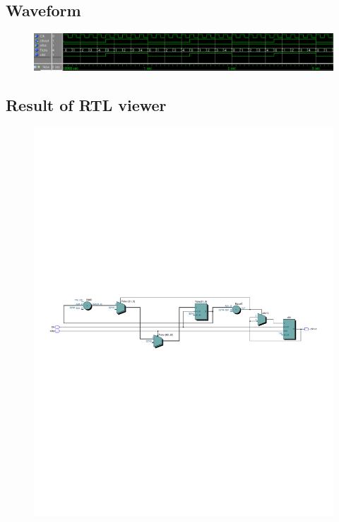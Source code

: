 \documentclass[13pt,a4paper]{report}
\begin{document}
\subsection{Waveform}
\begin{figure}[H]
\centering
\includegraphics[scale=0.6]{images/Exc4_waveform.png}
\end{figure}

\subsection{Result of RTL viewer}
\begin{figure}[H]
\centering
\includegraphics[scale=0.8, clip, trim={0cm 12cm 0cm 12cm}]{images/Exc4_RTL.pdf}
\end{figure}
\end{document}
